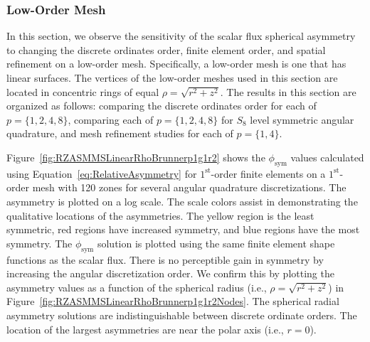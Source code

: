 \documentclass[12pt]{article}
\begin{document}
\subsubsection{Low-Order Mesh}
\label{subsec:LOMesh}
In this section, we observe the sensitivity of the scalar flux spherical asymmetry to changing the discrete ordinates order, finite element order, and spatial refinement on a low-order mesh. Specifically, a low-order mesh is one that has linear surfaces. The vertices of the low-order meshes used in this section are located in concentric rings of equal $\rho=\sqrt{r^2+z^2}$. The results in this section are organized as follows: comparing the discrete ordinates order for each of $p=\{1,2,4,8\}$, comparing each of $p=\{1,2,4,8\}$ for $S_8$ level symmetric angular quadrature, and mesh refinement studies for each of $p=\{1,4\}$.

Figure~\ref{fig:RZASMMSLinearRhoBrunnerp1g1r2} shows the $\phi_\text{sym}$ values calculated using Equation~\ref{eq:RelativeAsymmetry} for $1^\text{st}$-order finite elements on a $1^\text{st}$-order mesh with 120 zones for several angular quadrature discretizations. The asymmetry is plotted on a log scale. The scale colors assist in demonstrating the qualitative locations of the asymmetries. The yellow region is the least symmetric, red regions have increased symmetry, and blue regions have the most symmetry. The $\phi_\text{sym}$ solution is plotted using the same finite element shape functions as the scalar flux. There is no perceptible gain in symmetry by increasing the angular discretization order. We confirm this by plotting the asymmetry values as a function of the spherical radius (i.e., $\rho=\sqrt{r^2+z^2}$) in Figure~\ref{fig:RZASMMSLinearRhoBrunnerp1g1r2Nodes}. The spherical radial asymmetry solutions are indistinguishable between discrete ordinate orders. The location of the largest asymmetries are near the polar axis (i.e., $r=0$).
\end{document}
